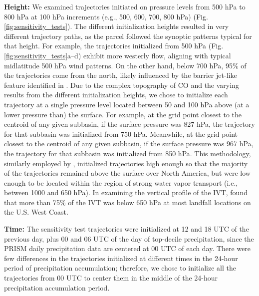 \documentclass[draft]{agujournal2019}
\begin{document}
\textbf{Height:} We examined trajectories initiated on pressure levels from 500 hPa to 800 hPa at 100 hPa increments (e.g., 500, 600, 700, 800 hPa) (Fig. \ref{fig:sensitivity_tests}). The different initialization heights resulted in very different trajectory paths, as the parcel followed the synoptic patterns typical for that height. For example, the trajectories initialized from 500 hPa (Fig. \ref{fig:sensitivity_tests}a--d) exhibit more westerly flow, aligning with typical midlatitude 500 hPa wind patterns. On the other hand, below 700 hPa, 95\% of the trajectories come from the north, likely influenced by the barrier jet-like feature identified in . Due to the complex topography of CO and the varying results from the different initialization heights, we chose to initialize each trajectory at a single pressure level located between 50 and 100 hPa above (at a lower pressure than) the surface. For example, at the grid point closest to the centroid of any given subbasin, if the surface pressure was 827 hPa, the trajectory for that subbasin was initialized from 750 hPa. Meanwhile, at the grid point closest to the centroid of any given subbasin, if the surface pressure was 967 hPa, the trajectory for that subbasin was initialized from 850 hPa. This methodology, similarly employed by , initialized trajectories high enough so that the majority of the trajectories remained above the surface over North America, but were low enough to be located within the region of strong water vapor transport (i.e., between 1000 and 650 hPa). In examining the vertical profile of the IVT,  found that more than 75\% of the IVT was below 650 hPa at most landfall locations on the U.S. West Coast. 

\textbf{Time:} The sensitivity test trajectories were initialized at 12 and 18 UTC of the previous day, plus 00 and 06 UTC of the day of top-decile precipitation, since the PRISM daily precipitation data are centered at 00 UTC of each day. There were few differences in the trajectories initialized at different times in the 24-hour period of precipitation accumulation; therefore, we chose to initialize all the trajectories from 00 UTC to center them in the middle of the 24-hour precipitation accumulation period. 
\end{document}
